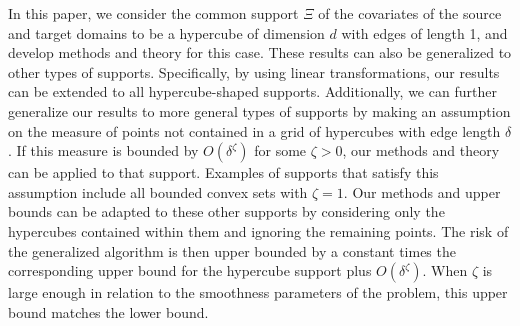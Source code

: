 \documentclass{article}
\begin{document}
In this paper, we consider the common support $\Xi$ of the covariates of the source and target domains to be a hypercube of dimension $d$ with edges of length 1, and develop methods and theory for this case.  These results can also be generalized to other types of supports. Specifically, by using linear transformations, our results can be extended to all hypercube-shaped supports. Additionally, we can further generalize our results to more general types of supports by making an assumption on the measure of points not contained in a grid of hypercubes with edge length $\delta$. If this measure is bounded by $O(\delta^\zeta)$ for some $\zeta>0$, our methods and theory can be applied to that support. Examples of supports that satisfy this assumption include all bounded convex sets with $\zeta=1$. Our methods and upper bounds can be adapted to these other supports by considering only the hypercubes contained within them and ignoring the remaining points. The risk of the generalized algorithm is then upper bounded by a constant times the corresponding upper bound for the hypercube support plus $O(\delta^\zeta)$. When $\zeta$ is large enough in relation to the smoothness parameters of the problem, this upper bound matches the lower bound.
\end{document}
